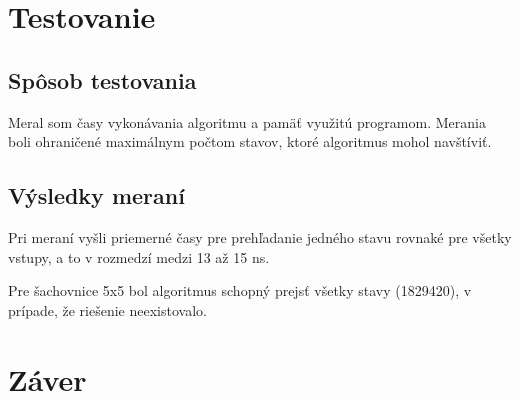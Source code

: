 \section{Testovanie}\label{sec:testovanie}

\subsection{Spôsob testovania}\label{subsec:spôsob-testovania}

Meral som časy vykonávania algoritmu a pamäť využitú programom.
Merania boli ohraničené maximálnym počtom stavov, ktoré algoritmus mohol navštíviť.

\subsection{Výsledky meraní}\label{subsec:výsledky}

Pri meraní vyšli priemerné časy pre prehľadanie jedného stavu rovnaké pre všetky vstupy, a to v rozmedzí medzi 13 až 15 ns.

Pre šachovnice 5x5 bol algoritmus schopný prejsť všetky stavy (1829420), v prípade, že riešenie neexistovalo.







\section{Záver}\label{sec:záver}







\endgroup